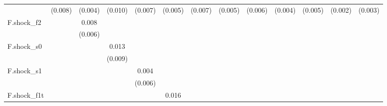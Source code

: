 {\begin{tabular}{l*{12}{c}}
            &     (0.008)         &     (0.004)         &     (0.010)         &     (0.007)         &     (0.005)         &     (0.007)         &     (0.005)         &     (0.006)         &     (0.004)         &     (0.005)         &     (0.002)         &     (0.003)         \\
\addlinespace
F.shock\_f2  &                     &       0.008         &                     &                     &                     &                     &                     &                     &                     &                     &                     &                     \\
            &                     &     (0.006)         &                     &                     &                     &                     &                     &                     &                     &                     &                     &                     \\
\addlinespace
F.shock\_s0  &                     &                     &       0.013         &                     &                     &                     &                     &                     &                     &                     &                     &                     \\
            &                     &                     &     (0.009)         &                     &                     &                     &                     &                     &                     &                     &                     &                     \\
\addlinespace
F.shock\_s1  &                     &                     &                     &       0.004         &                     &                     &                     &                     &                     &                     &                     &                     \\
            &                     &                     &                     &     (0.006)         &                     &                     &                     &                     &                     &                     &                     &                     \\
\addlinespace
F.shock\_f1t &                     &                     &                     &                     &       0.016         &                     &                     &                     &                     &                     &                     &                     \\

\end{tabular}}
